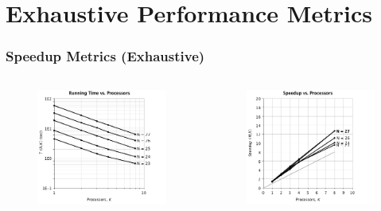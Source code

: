 \documentclass[handout,10pt]{beamer}
\begin{document}
\section{Exhaustive Performance Metrics}
\begin{frame}
	\frametitle{Speedup Metrics (Exhaustive)}

\begin{columns}
	\vspace{-1em}
	\begin{figure}
	\centering
	\includegraphics[scale = 0.25]{ge_speed_4.png}
	\end{figure}
	\vspace{-2em}
	\begin{figure}
	\centering
	\includegraphics[scale = 0.25]{ge_speed_3.png}

\end{figure}
\end{columns}
\end{frame}
\end{document}
